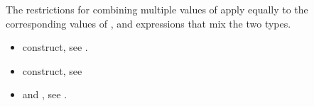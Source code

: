 The restrictions for combining multiple values of  apply equally 
to the corresponding values of , and expressions that mix the 
two types.

\crossreferences
\begin{itemize}
\item {} construct, see .

\item {} construct, see

\item {} and , see
.
\end{itemize}
